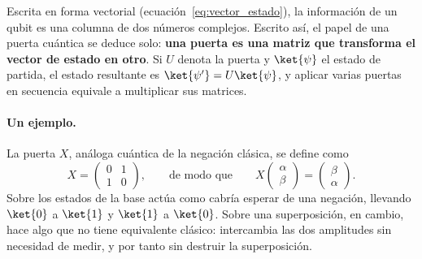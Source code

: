 Escrita en forma vectorial (ecuación~\eqref{eq:vector_estado}), la información de un qubit
es una columna de dos números complejos. Escrito así, el papel de una puerta cuántica se deduce solo: \textbf{una puerta es una
matriz que transforma el vector de estado en otro}. Si $U$ denota la puerta y $\ket{\psi}$
el estado de partida, el estado resultante es $\ket{\psi'} = U\ket{\psi}$, y aplicar varias
puertas en secuencia equivale a multiplicar sus matrices.

\paragraph{Un ejemplo.} La puerta $X$, análoga cuántica de la negación clásica, se define
como
\begin{equation}
\label{eq:puerta_x}
X = \begin{pmatrix} 0 & 1 \\ 1 & 0 \end{pmatrix},
\qquad\text{de modo que}\qquad
X\begin{pmatrix} \alpha \\ \beta \end{pmatrix} = \begin{pmatrix} \beta \\ \alpha \end{pmatrix}.
\end{equation}
Sobre los estados de la base actúa como cabría esperar de una negación, llevando $\ket{0}$
a $\ket{1}$ y $\ket{1}$ a $\ket{0}$. Sobre una superposición, en cambio, hace algo que no
tiene equivalente clásico: intercambia las dos amplitudes sin necesidad de medir, y por
tanto sin destruir la superposición.

